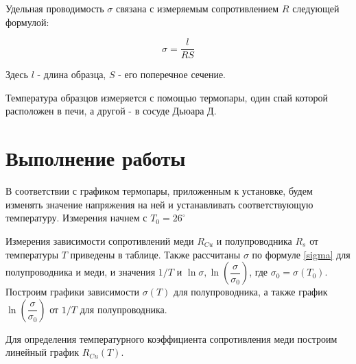 \documentclass[12pt]{kiarticle} %
\begin{document}
	Удельная проводимость $\sigma$ связана с измеряемым сопротивлением $R$ следующей формулой: 
	
\begin{equation}\label{sigma}
	 \sigma = \frac{l}{RS} 
\end{equation}
	
	Здесь $l$ - длина образца, $S$ - его поперечное сечение.
	
	Температура образцов измеряется с помощью термопары, один спай которой расположен в печи, а другой - в сосуде Дьюара Д. 
	
	\section{Выполнение работы}
	
	В соответствии с графиком термопары, приложенным к установке, будем изменять значение напряжения на ней и устанавливать соответствующую температуру. Измерения начнем с $ T_0 = 26^\circ $
	
	Измерения зависимости сопротивлений меди $R_{Cu}$ и полупроводника $R_s$ от температуры $T$ приведены в таблице. Также рассчитаны $ \sigma $ по формуле \eqref{sigma} для полупроводника и меди, и значения $ 1/T$ и $ \ln \sigma, \ln \left( \dfrac{\sigma}{\sigma_0} \right) $, где $ \sigma_0 = \sigma (T_0) $. Построим графики зависимости $ \sigma (T) $ для полупроводника, а также график $ \ln \left( \dfrac{\sigma}{\sigma_0} \right) $ от $ 1/T $ для полупроводника. 
	
	Для определения температурного коэффициента сопротивления меди построим линейный график $ R_{Cu}(T) $.
	
\end{document}
